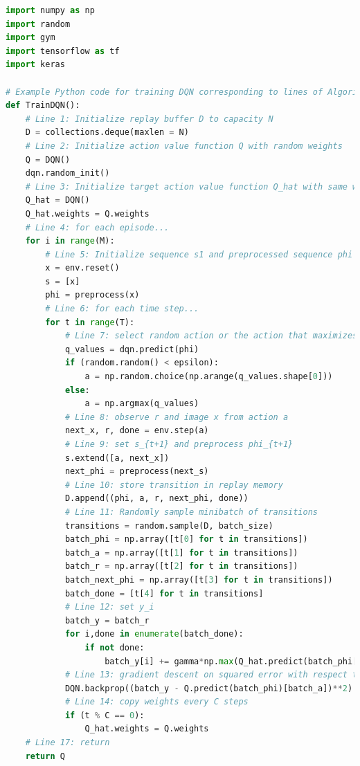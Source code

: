 \documentclass[11pt]{article}
\begin{document}
\lstset{style=mystyle}
\begin{lstlisting}[language=Python, caption=Deep Q-learning]
import numpy as np
import random
import gym
import tensorflow as tf
import keras

# Example Python code for training DQN corresponding to lines of Algorithm 8
def TrainDQN():
    # Line 1: Initialize replay buffer D to capacity N
    D = collections.deque(maxlen = N)
    # Line 2: Initialize action value function Q with random weights  
    Q = DQN()
    dqn.random_init()
    # Line 3: Initialize target action value function Q_hat with same weights
    Q_hat = DQN()
    Q_hat.weights = Q.weights
    # Line 4: for each episode...
    for i in range(M):
        # Line 5: Initialize sequence s1 and preprocessed sequence phi
        x = env.reset()
        s = [x]
        phi = preprocess(x)
        # Line 6: for each time step...
        for t in range(T):
            # Line 7: select random action or the action that maximizes Q
            q_values = dqn.predict(phi)
            if (random.random() < epsilon):
                a = np.random.choice(np.arange(q_values.shape[0]))
            else:
                a = np.argmax(q_values) 
            # Line 8: observe r and image x from action a
            next_x, r, done = env.step(a)
            # Line 9: set s_{t+1} and preprocess phi_{t+1}
            s.extend([a, next_x])
            next_phi = preprocess(next_s)
            # Line 10: store transition in replay memory
            D.append((phi, a, r, next_phi, done))
            # Line 11: Randomly sample minibatch of transitions
            transitions = random.sample(D, batch_size) 
            batch_phi = np.array([t[0] for t in transitions])
            batch_a = np.array([t[1] for t in transitions])
            batch_r = np.array([t[2] for t in transitions])
            batch_next_phi = np.array([t[3] for t in transitions])
            batch_done = [t[4] for t in transitions]
            # Line 12: set y_i
            batch_y = batch_r
            for i,done in enumerate(batch_done):
                if not done:
                    batch_y[i] += gamma*np.max(Q_hat.predict(batch_phi[i]))
            # Line 13: gradient descent on squared error with respect to theta
            DQN.backprop((batch_y - Q.predict(batch_phi)[batch_a])**2)
            # Line 14: copy weights every C steps
            if (t % C == 0): 
                Q_hat.weights = Q.weights
    # Line 17: return 
    return Q
\end{lstlisting}
\end{document}
